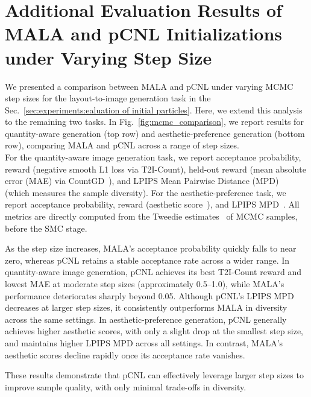 \section{Additional Evaluation Results of MALA and pCNL Initializations under Varying Step Size}
\label{sec:appx:variying step size}
\vspace{-0.1cm}
We presented a comparison between MALA and pCNL under varying MCMC step sizes for the layout-to-image generation task in the Sec.~\ref{sec:experiments:ealuation of initial particles}. Here, we extend this analysis to the remaining two tasks. In Fig.~\ref{fig:mcmc_comparison}, we report results for quantity-aware generation (top row) and aesthetic-preference generation (bottom row), comparing MALA and pCNL across a range of step sizes.\\
For the quantity-aware image generation task, we report acceptance probability, reward (negative smooth L1 loss via T2I-Count\cite{qian2025t2icount}), held-out reward (mean absolute error (MAE) via CountGD~\cite{AminiNaieni2024countgd}), and LPIPS Mean Pairwise Distance (MPD)~\cite{zhang2018unreasonableLPIPS} (which measures the sample diversity).
For the aesthetic-preference task, we report acceptance probability, reward (aesthetic score~\cite{schuhmann2022aesthetic}), and LPIPS MPD~\cite{zhang2018unreasonableLPIPS}. All metrics are directly computed from the Tweedie estimates~\cite{efron2011tweedie} of MCMC samples, before the SMC stage.

As the step size increases, MALA's acceptance probability quickly falls to near zero, whereas pCNL retains a stable acceptance rate across a wider range.
In quantity-aware image generation, pCNL achieves its best T2I-Count reward and lowest MAE at moderate step sizes (approximately 0.5–1.0), while MALA’s performance deteriorates sharply beyond 0.05. Although pCNL’s LPIPS MPD decreases at larger step sizes, it consistently outperforms MALA in diversity across the same settings. In aesthetic-preference generation, pCNL generally achieves higher aesthetic scores, with only a slight drop at the smallest step size, and maintains higher LPIPS MPD across all settings. In contrast, MALA’s aesthetic scores decline rapidly once its acceptance rate vanishes.

These results demonstrate that pCNL can effectively leverage larger step sizes to improve sample quality, with only minimal trade-offs in diversity.
\vspace{0.2cm}

